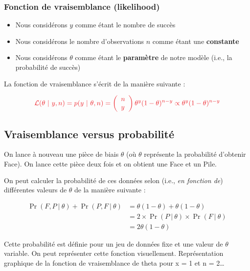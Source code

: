 \documentclass[
  a4paper,11pt,twoside,onecolumn,openright,final,oldfontcommands]{memoir}
\providecommand{\tightlist}{%
  \setlength{\itemsep}{0pt}\setlength{\parskip}{0pt}}
\theoremstyle{definition}
\theoremstyle{definition}
\theoremstyle{definition}
\theoremstyle{remark}
\begin{document}
\hypertarget{fonction-de-vraisemblance-likelihood}{%
\subsubsection{Fonction de vraisemblance (likelihood)}\label{fonction-de-vraisemblance-likelihood}}

\begin{itemize}
\tightlist
\item
  Nous considérons \(y\) comme étant le nombre de succès
\item
  Nous considérons le nombre d'observations \(n\) comme étant une \textbf{constante}
\item
  Nous considérons \(\theta\) comme étant le \textbf{paramètre} de notre modèle (i.e., la probabilité de succès)
\end{itemize}

La fonction de vraisemblance s'écrit de la manière suivante :

\[
\color{orangered}{\mathcal{L}(\theta\ |\ y, n) = p(y \ |\ \theta, n) = \left(\begin{array}{l} n \\ y \end{array}\right) \theta^{y}(1 - \theta)^{n - y} \propto \theta^{y}(1 - \theta)^{n - y}}
\]

\hypertarget{vraisemblance-versus-probabilituxe9}{%
\subsection{Vraisemblance versus probabilité}\label{vraisemblance-versus-probabilituxe9}}

On lance à nouveau une pièce de biais \(\theta\) (où \(\theta\) représente la probabilité d'obtenir Face). On lance cette pièce deux fois et on obtient une Face et un Pile.

On peut calculer la probabilité de ces données selon (i.e., \emph{en fonction de}) différentes valeurs de \(\theta\) de la manière suivante :

\[
\begin{aligned}
\Pr(F, P \ | \ \theta) + \Pr(P, F \ | \ \theta) &= \theta(1 - \theta) + \theta(1 - \theta) \\
&= 2 \times \Pr(P \ | \ \theta) \times \Pr(F \ | \ \theta) \\
&= 2 \theta(1 - \theta)
\end{aligned}
\]

Cette probabilité est définie pour un jeu de données fixe et une valeur de \(\theta\) variable. On peut représenter cette fonction visuellement. Représentation graphique de la fonction de vraisemblance de theta pour x = 1 et n = 2\ldots{}
\end{document}
